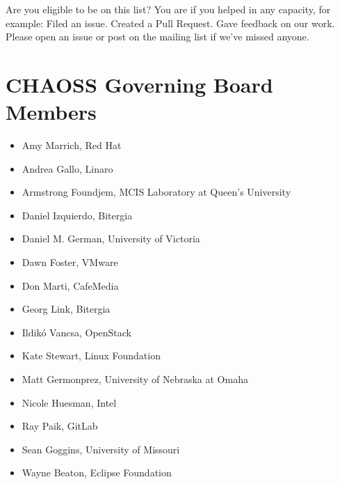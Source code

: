 Are you eligible to be on this list? You are if you helped in any
capacity, for example: Filed an issue. Created a Pull Request. Gave
feedback on our work. Please open an issue or post on the mailing list
if we've missed anyone.

\hypertarget{chaoss-governing-board-members}{%
\section{CHAOSS Governing Board
Members}\label{chaoss-governing-board-members}}

\begin{itemize}
\tightlist
\item
  Amy Marrich, Red Hat
\item
  Andrea Gallo, Linaro
\item
  Armstrong Foundjem, MCIS Laboratory at Queen's University
\item
  Daniel Izquierdo, Bitergia
\item
  Daniel M. German, University of Victoria
\item
  Dawn Foster, VMware
\item
  Don Marti, CafeMedia
\item
  Georg Link, Bitergia
\item
  Ildikó Vancsa, OpenStack
\item
  Kate Stewart, Linux Foundation
\item
  Matt Germonprez, University of Nebraska at Omaha
\item
  Nicole Huesman, Intel
\item
  Ray Paik, GitLab
\item
  Sean Goggins, University of Missouri
\item
  Wayne Beaton, Eclipse Foundation
\end{itemize}
